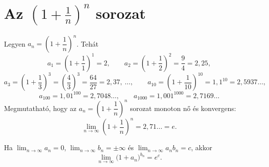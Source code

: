 \documentclass[11pt]{article}
\begin{document}
\section{Az $\left(1+\frac{1}{n}\right)^{n}$ sorozat}

Legyen $a_{n}=\left(1+\dfrac{1}{n}\right)^{n}$. Tehát
\[
a_{1}=\left(1+\frac{1}{1}\right)^{1}=2,\qquad
a_{2}=\left(1+\frac{1}{2}\right)^{2}=\frac{9}{4}=2,25,
\]
\[
a_{3}=\left(1+\frac{1}{3}\right)^{3}=\left(\frac{4}{3}\right)^{3}=\frac{64}{27}=2,37,\ \dots,\qquad
a_{10}=\left(1+\frac{1}{10}\right)^{10}=1,1^{10}=2,5937\ldots,
\]
\[
a_{100}=1,01^{100}=2,7048\ldots,\qquad
a_{1000}=1,001^{1000}=2,7169\ldots
\]
Megmutatható, hogy az $a_{n}=\left(1+\dfrac{1}{n}\right)^{n}$ sorozat monoton nő és konvergens:
\begin{equation}\label{eq:e}
\lim_{n\to\infty}\left(1+\frac{1}{n}\right)^{n}=2,71\ldots=e .
\end{equation}

\begin{thmbox}
\begin{theorem}
Ha $\displaystyle\lim_{n\to\infty}a_{n}=0$, $\displaystyle\lim_{n\to\infty}b_{n}=\pm\infty$ és $\displaystyle\lim_{n\to\infty}a_{n}b_{n}=c$, akkor
\begin{equation}\label{eq:altalanos}
\lim_{n\to\infty}\bigl(1+a_{n}\bigr)^{b_{n}}=e^{c}.
\end{equation}
\end{theorem}
\end{thmbox}
\end{document}

